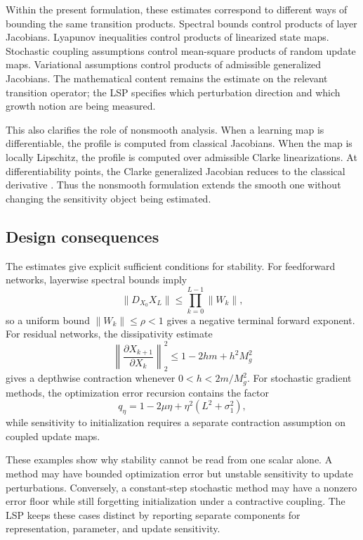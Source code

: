 \documentclass{article}
\numberwithin{equation}{section}
\begin{document}
Within the present formulation, these estimates correspond to different ways of bounding the same transition products. Spectral bounds control products of layer Jacobians. Lyapunov inequalities control products of linearized state maps. Stochastic coupling assumptions control mean-square products of random update maps. Variational assumptions control products of admissible generalized Jacobians. The mathematical content remains the estimate on the relevant transition operator; the LSP specifies which perturbation direction and which growth notion are being measured.

This also clarifies the role of nonsmooth analysis. When a learning map is differentiable, the profile is computed from classical Jacobians. When the map is locally Lipschitz, the profile is computed over admissible Clarke linearizations. At differentiability points, the Clarke generalized Jacobian reduces to the classical derivative \cite{Clarke1990Optimization}. Thus the nonsmooth formulation extends the smooth one without changing the sensitivity
object being estimated.

\subsection{Design consequences}
\label{subsec:design-consequences}

The estimates give explicit sufficient conditions for stability. For feedforward networks, layerwise spectral bounds imply
\[
\|D_{X_0}X_L\|\le \prod_{k=0}^{L-1}\|W_k\|,
\]
so a uniform bound \(\|W_k\|\le\rho<1\) gives a negative terminal forward exponent. For residual networks, the dissipativity estimate
\[
\left\|\frac{\partial X_{k+1}}{\partial X_k}\right\|_2^2
\le
1-2hm+h^2M_g^2
\]
gives a depthwise contraction whenever \(0<h<2m/M_g^2\). For stochastic gradient methods, the optimization error recursion contains the factor
\[
q_\eta=1-2\mu\eta+\eta^2(L^2+\sigma_1^2),
\]
while sensitivity to initialization requires a separate contraction assumption on coupled update maps.

These examples show why stability cannot be read from one scalar alone. A method may have bounded optimization error but unstable sensitivity to update perturbations. Conversely, a constant-step stochastic method may have a nonzero error floor while still forgetting initialization under a contractive coupling. The LSP keeps these cases distinct by reporting separate components for representation, parameter, and update sensitivity.
\end{document}
